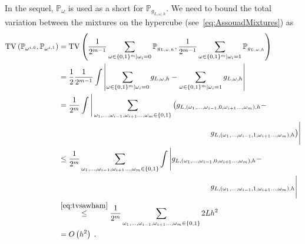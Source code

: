 \documentclass[10pt]{article} %
\newcommand{\Prob}[0]{\mathbb{P}}
\newcommand\tv[2]{\mathrm{TV}\left( {#1}, {#2} \right)}
\newcommand\p[1]{\left( {#1}\right)}
\newcommand\RG[1]{\textcolor{red}{#1}}
\begin{document}
In the sequel, $\Prob_{\omega}$ is used as a short for $\Prob_{g_{L, \omega, h}}$. We need to bound the total variation between the mixtures on the hypercube (see~\eqref{eq:AssouadMixtures}) as%
\begin{equation*}
\begin{aligned}
    \tv{\Prob_{\omega^{i,0}}}{\Prob_{\omega^{i,1}}}
     &= \tv{\frac{1}{2^{m-1}} \sum_{\omega \in \{0, 1 \}^m | \omega_i = 0} \Prob_{g_{L, \omega, h}} }{\frac{1}{2^{m-1}} \sum_{\omega \in \{0, 1 \}^m | \omega_i = 1} \Prob_{g_{L, \omega, h}} } \\
    &= \frac{1}{2} \frac{1}{2^{m-1}} \int \left| \sum_{\omega \in \{0, 1 \}^m | \omega_i = 0} g_{L, \omega, h} - \sum_{\omega \in \{0, 1 \}^m | \omega_i = 1} g_{L, \omega, h} \right| \\
    &= \frac{1}{2^m} \int \Bigg| \sum_{\omega_1, \dots, \omega_{i-1}, \omega_{i+1} \dots, \omega_{m} \in \{0, 1 \}} \big( g_{L,  (\omega_1, \dots, \omega_{i-1}, 0, \omega_{i+1} \dots, \omega_{m}), h} - \\  
    &\quad\quad\quad\quad\quad\quad\quad\quad\quad\quad\quad\quad\quad\quad\quad\quad\quad\quad\quad\quad g_{L, (\omega_1, \dots, \omega_{i-1}, 1, \omega_{i+1} \dots, \omega_{m}), h} \big) \Bigg| \\
    &\leq \frac{1}{2^m} \sum_{\omega_1, \dots, \omega_{i-1}, \omega_{i+1} \dots, \omega_{m} \in \{0, 1 \}} \int \Bigg|   g_{L, (\omega_1, \dots, \omega_{i-1}, 0, \omega_{i+1} \dots, \omega_{m}), h} - \\  
    &\quad\quad\quad\quad\quad\quad\quad\quad\quad\quad\quad\quad\quad\quad\quad\quad\quad\quad\quad\quad g_{L,  (\omega_1, \dots, \omega_{i-1}, 1, \omega_{i+1} \dots, \omega_{m}), h}  \Bigg| \\
    &\stackrel{\eqref{eq:tvsawham}}{\leq} \frac{1}{2^m} \sum_{\omega_1, \dots, \omega_{i-1}, \omega_{i+1} \dots, \omega_{m} \in \{0, 1 \}} 2 L h^2  \\
    &= O \p{h^{2}}\;.
\end{aligned}  
\end{equation*}
\end{document}
